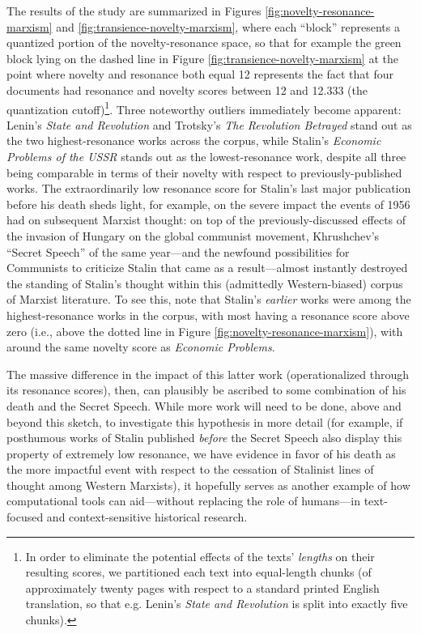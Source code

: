 \documentclass[11pt]{article}
\begin{document}
The results of the study are summarized in Figures \ref{fig:novelty-resonance-marxism} and \ref{fig:transience-novelty-marxism}, where each ``block'' represents a quantized portion of the novelty-resonance space, so that for example the green block lying on the dashed line in Figure \ref{fig:transience-novelty-marxism} at the point where novelty and resonance both equal 12 represents the fact that four documents had resonance and novelty scores between 12 and 12.333 (the quantization cutoff)\footnote{In order to eliminate the potential effects of the texts' \textit{lengths} on their resulting scores, we partitioned each text into equal-length chunks (of approximately twenty pages with respect to a standard printed English translation, so that e.g. Lenin's \textit{State and Revolution} is split into exactly five chunks).}. Three noteworthy outliers immediately become apparent: Lenin's \textit{State and Revolution} and Trotsky's \textit{The Revolution Betrayed} stand out as the two highest-resonance works across the corpus, while Stalin's \textit{Economic Problems of the USSR} stands out as the lowest-resonance work, despite all three being comparable in terms of their novelty with respect to previously-published works. The extraordinarily low resonance score for Stalin's last major publication before his death sheds light, for example, on the severe impact the events of 1956 had on subsequent Marxist thought: on top of the previously-discussed effects of the invasion of Hungary on the global communist movement, Khrushchev's ``Secret Speech'' of the same year---and the newfound possibilities for Communists to criticize Stalin that came as a result---almost instantly destroyed the standing of Stalin's thought within this (admittedly Western-biased) corpus of Marxist literature. To see this, note that Stalin's \textit{earlier} works were among the highest-resonance works in the corpus, with most having a resonance score above zero (i.e., above the dotted line in Figure \ref{fig:novelty-resonance-marxism}), with around the same novelty score as \textit{Economic Problems}.

The massive difference in the impact of this latter work (operationalized through its resonance scores), then, can plausibly be ascribed to some combination of his death and the Secret Speech. While more work will need to be done, above and beyond this sketch, to investigate this hypothesis in more detail (for example, if posthumous works of Stalin published \textit{before} the Secret Speech also display this property of extremely low resonance, we have evidence in favor of his death as the more impactful event with respect to the cessation of Stalinist lines of thought among Western Marxists), it hopefully serves as another example of how computational tools can aid---without replacing the role of humans---in text-focused and context-sensitive historical research.
\end{document}
